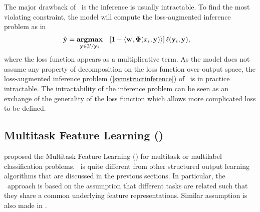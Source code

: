{The major drawback of \svmstruct\ is the inference is usually intractable.
To find the most violating constraint, the model will compute the loss-augmented inference problem as in \citep{TJTA05}
\begin{align}
	\hat{\mathbf {y}} = \underset{\mathbf {y}\in\mathcal{Y}/\mathbf {y}_i}{\textbf{argmax}} &\quad [1-\langle \mathbf {w}, \mathbf{\Phi}(x_i,\mathbf {y}) \rangle]\,\mathbf {\ell}(\mathbf {y}_i,\mathbf {y}) \label{svmstructinference},
\end{align}
where the loss function appears as a multiplicative term.
As the model does not assume any property of decomposition on the loss function over output space, the loss-augmented inference problem (\ref{svmstructinference}) of \svmstruct\ is in practice intractable. 
The intractability of the inference problem can be seen as an exchange of the generality of the loss function which allows more complicated loss to be defined. 


%
\subsection{Multitask Feature Learning (\mtl)}

\citet{Argyriou07multitask} proposed the Multitask Feature Learning (\mtl) for multitask or multilabel classification problems.
\mtl\ is quite different from other structured output learning algorithms that are discussed in the previous sections.
In particular, the \mtl\ approach is based on the assumption that different tasks are related such that they share a common underlying feature representations.
Similar assumption is also made in \citep{Caruana97multitask,Baxter00a,BenDavide03exploiting}.

}
